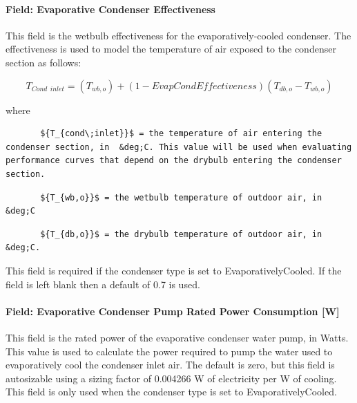 \paragraph{Field: Evaporative Condenser Effectiveness}\label{field-evaporative-condenser-effectiveness-2}

This field is the wetbulb effectiveness for the evaporatively-cooled condenser. The effectiveness is used to model the temperature of air exposed to the condenser section as follows:

\begin{equation}
{T_{Cond\,\;inlet}} = \left( {{T_{wb,o}}} \right) + \left( {1 - EvapCondEffectiveness} \right)\left( {{T_{db,o}} - {T_{wb,o}}} \right)
\end{equation}

where

\begin{lstlisting}
       ${T_{cond\;inlet}}$ = the temperature of air entering the condenser section, in  &deg;C. This value will be used when evaluating performance curves that depend on the drybulb entering the condenser section.
\end{lstlisting}

\begin{lstlisting}
       ${T_{wb,o}}$ = the wetbulb temperature of outdoor air, in  &deg;C
\end{lstlisting}

\begin{lstlisting}
       ${T_{db,o}}$ = the drybulb temperature of outdoor air, in  &deg;C.
\end{lstlisting}

This field is required if the condenser type is set to EvaporativelyCooled. If the field is left blank then a default of 0.7 is used.

\paragraph{Field: Evaporative Condenser Pump Rated Power Consumption {[}W{]}}\label{field-evaporative-condenser-pump-rated-power-consumption-w}

This field is the rated power of the evaporative condenser water pump, in Watts. This value is used to calculate the power required to pump the water used to evaporatively cool the condenser inlet air. The default is zero, but this field is autosizable using a sizing factor of 0.004266 W of electricity per W of cooling. This field is only used when the condenser type is set to EvaporativelyCooled.

